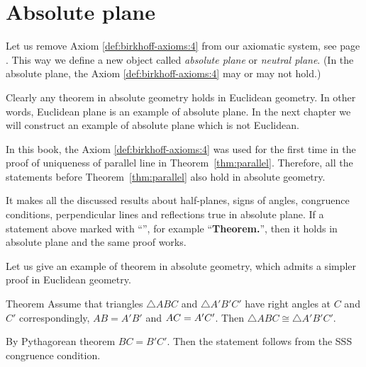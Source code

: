 \chapter{Absolute plane}\label{chap:non-euclid}

Let us remove Axiom \ref{def:birkhoff-axioms:4} from our axiomatic system, see page \pageref{def:birkhoff-axioms:0}.
This way we define a new object called 
\emph{absolute plane} or \emph{neutral plane}.
(In the absolute plane, 
the Axiom \ref{def:birkhoff-axioms:4} may or may not hold.)

Clearly any theorem in absolute geometry holds in Euclidean geometry.
In other words, Euclidean plane is an example of absolute plane. 
In the next chapter we will construct an example of absolute plane which is not Euclidean.

In this book, 
the Axiom \ref{def:birkhoff-axioms:4} was used
for the first time in the proof of uniqueness of parallel line in Theorem~\ref{thm:parallel}.
Therefore, all the statements before Theorem~\ref{thm:parallel} also hold in absolute geometry.

It makes all the discussed results
about
half-planes,
signs of angles,
congruence conditions,
perpendicular lines and reflections 
true in absolute plane.
If a statement above marked with ``\a'',\label{a-mark} for example ``\textbf{Theorem.\abs}'', then it holds in absolute plane and the same proof works.


Let us give an example of theorem in absolute geometry,
which admits a simpler proof in Euclidean geometry. 

\begin{thm}{Theorem}
Assume that triangles $\triangle ABC$ and $\triangle A'B'C'$
have right angles at $C$ and $C'$ correspondingly, 
$AB=A'B'$ and $AC\z=A'C'$.
Then $\triangle ABC\cong\triangle A'B'C'$.
\end{thm}


By Pythagorean theorem $BC=B'C'$.
Then the statement follows from the SSS congruence condition.
\qeds

